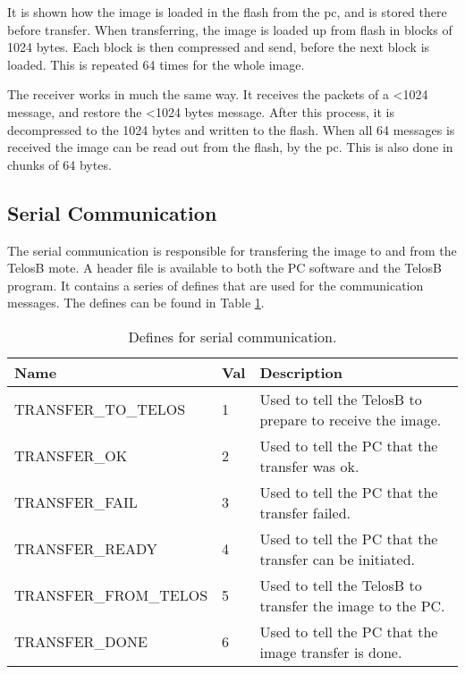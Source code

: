 It is shown how the image is loaded in the flash from the pc, and is stored there before transfer. When transferring, the image is loaded up from flash in blocks of 1024 bytes. Each block is then compressed and send, before the next block is loaded. This is repeated 64 times for the whole image.

The receiver works in much the same way. It receives the packets of a <1024 message, and restore the <1024 bytes message. After this process, it is decompressed to the 1024 bytes and written to the flash. When all 64 messages is received the image can be read out from the flash, by the pc. This is also done in chunks of 64 bytes. 

\subsection{Serial Communication}
\label{sec:Serial-Communication}
The serial communication is responsible for transfering the image to and from the TelosB mote. A header file is available to both the PC software and the TelosB program. It contains a series of defines that are used for the communication messages. The defines can be found in Table \ref{definetable}.
\begin{table}[H]
\centering
    \begin{tabular}{lll}
    \hline
    Name                  & Val & Description                                               \\ \hline
    \rowcolor{gr}
    TRANSFER\_TO\_TELOS   & 1     & Used to tell the TelosB to prepare to receive the image. \\ %
    TRANSFER\_OK          & 2     & Used to tell the PC that the transfer was ok.             \\ %
    \rowcolor{gr}
    TRANSFER\_FAIL        & 3     & Used to tell the PC that the transfer failed.             \\ %
    TRANSFER\_READY       & 4     & Used to tell the PC that the transfer can be initiated.   \\ %
    \rowcolor{gr}
    TRANSFER\_FROM\_TELOS & 5     & Used to tell the TelosB to transfer the image to the PC.  \\ %
    TRANSFER\_DONE        & 6     & Used to tell the PC that the image transfer is done.      \\ \hline
    \end{tabular}
    \caption{Defines for serial communication.}
    \label{definetable}
\end{table}

